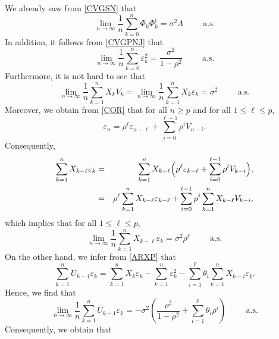 \documentclass[article,12pt]{amsart}
\numberwithin{equation}{section}
\theoremstyle{plain}
\begin{document}
We already saw from \eqref{CVGSN} that
\begin{equation}
\label{CVGCPHI}
\lim_{n\rightarrow \infty} \frac{1}{n}\sum_{k=0}^{n}\Phi_k \Phi_k^{t}=\sigma^2 \Lambda \hspace{1cm} \text{a.s.}
\end{equation}
In addition, it follows from \eqref{CVGPNJ} that
\begin{equation}
\label{CVGCVEPS}
\lim_{n\rightarrow \infty} \frac{1}{n}\sum_{k=0}^{n}{\varepsilon}_k^2=\frac{\sigma^2}{1- \rho^2} \hspace{1cm} \text{a.s.}
\end{equation}
Furthermore, it is not hard to see that
\begin{equation*}
\lim_{n\rightarrow \infty} \frac{1}{n}\sum_{k=1}^{n}X_kV_k=\lim_{n\rightarrow \infty} \frac{1}{n}\sum_{k=1}^{n}X_k{\varepsilon}_k
=\sigma^2 \hspace{1cm} \text{a.s.}
\end{equation*}
Moreover, we obtain from \eqref{COR} that for all $n \geq p$ and for all $1 \leq \ell \leq p$,
$${\varepsilon}_{n} = \rho^\ell {\varepsilon}_{n-\ell} +  \sum_{i=0}^{\ell-1} \rho^i V_{n-i}.$$
Consequently,
\begin{eqnarray*}
\sum_{k=1}^{n} X_{k-\ell}{\varepsilon}_{k} & = & 
\sum_{k=1}^{n} X_{k-\ell} \Bigl(\rho^\ell {\varepsilon}_{k-\ell} +  \sum_{i=0}^{\ell-1} \rho^i V_{k-i}\Bigr),\\
& = & \rho^\ell \sum_{k=1}^{n} X_{k-\ell} {\varepsilon}_{k-\ell} 
+ \sum_{i=0}^{\ell-1} \rho^i  \sum_{k=1}^{n} X_{k-\ell} V_{k-i},
\end{eqnarray*}
which implies that for all $1 \leq \ell \leq p$,
\begin{equation*}
\lim_{n\rightarrow \infty} \frac{1}{n}\sum_{k=1}^{n}X_{k-\ell}{\varepsilon}_{k}
=\sigma^2 \rho^\ell\hspace{1cm} \text{a.s.}
\end{equation*}
On the other hand, we infer from \eqref{ARXP} that
$$
\sum_{k=1}^n U_{k-1} {\varepsilon}_k=\sum_{k=1}^{n}X_k{\varepsilon}_k - \sum_{k=1}^{n}{\varepsilon}_k^{2}
-\sum_{i=1}^p \theta_{i} \sum_{k=1}^n X_{k-i} {\varepsilon}_k.
$$
Hence, we find that
\begin{equation*}
\lim_{n\rightarrow \infty} \frac{1}{n} \sum_{k=1}^{n} U_{k-1}{\varepsilon}_{k} 
 =  -\sigma^2 \left( \frac{\rho^2}{1- \rho^2} + \sum_{i=1}^p \theta_{i} \rho^{i} \right)
\hspace{1cm} \text{a.s.}
\end{equation*}
Consequently, we obtain that
\end{document}
